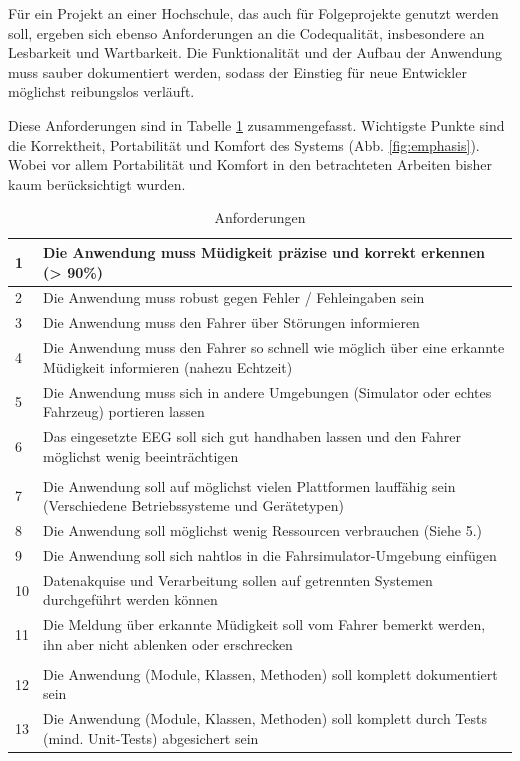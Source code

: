 Für ein Projekt an einer Hochschule, das auch für Folgeprojekte genutzt werden soll, ergeben sich ebenso Anforderungen an die Codequalität, insbesondere an Lesbarkeit und Wartbarkeit. Die Funktionalität und der Aufbau der Anwendung muss sauber dokumentiert werden, sodass der Einstieg für neue Entwickler möglichst reibungslos verläuft.

Diese Anforderungen sind in Tabelle \ref{tab:requirements} zusammengefasst. Wichtigste Punkte sind die Korrektheit, Portabilität und Komfort des Systems (Abb. \ref{fig:emphasis}). Wobei vor allem Portabilität und Komfort in den betrachteten Arbeiten bisher kaum berücksichtigt wurden.

\begin{table}[t]
 \caption{Anforderungen}
 \renewcommand{\arraystretch}{2}
 \begin{tabularx}{\textwidth}{lX}
  1 & Die Anwendung muss Müdigkeit präzise und korrekt erkennen (> 90\%) \\ \hline
  2 & Die Anwendung muss robust gegen Fehler / Fehleingaben sein \\ \hline 
  3 & Die Anwendung muss den Fahrer über Störungen informieren \\ \hline
  4 & Die Anwendung muss den Fahrer so schnell wie möglich über eine erkannte Müdigkeit informieren (nahezu Echtzeit)\\ \hline
  5 & Die Anwendung muss sich in andere Umgebungen (Simulator oder echtes Fahrzeug) portieren lassen \\ \hline 
  6 & Das eingesetzte EEG soll sich gut handhaben lassen und den Fahrer möglichst wenig beeinträchtigen \\ \hline
  \\
  7 & Die Anwendung soll auf möglichst vielen Plattformen lauffähig sein (Verschiedene Betriebssysteme und Gerätetypen) \\ \hline
  8 & Die Anwendung soll möglichst wenig Ressourcen verbrauchen (Siehe 5.) \\ \hline
  9 & Die Anwendung soll sich nahtlos in die Fahrsimulator-Umgebung einfügen \\ \hline
  10 & Datenakquise und Verarbeitung sollen auf getrennten Systemen durchgeführt werden können \\ \hline
  11 & Die Meldung über erkannte Müdigkeit soll vom Fahrer bemerkt werden, ihn aber nicht ablenken oder erschrecken \\ \hline
  \\
  12 & Die Anwendung (Module, Klassen, Methoden) soll komplett dokumentiert sein \\ \hline 
  13 & Die Anwendung (Module, Klassen, Methoden) soll komplett durch Tests (mind. Unit-Tests) abgesichert sein \\ \hline
 \end{tabularx}
 \label{tab:requirements}
\end{table}

